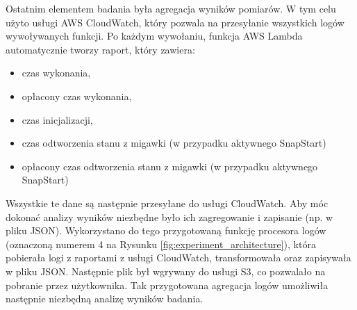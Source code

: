 Ostatnim elementem badania była agregacja wyników pomiarów.
W tym celu użyto usługi AWS CloudWatch, który pozwala na przesyłanie wszystkich logów wywoływanych funkcji.
Po każdym wywołaniu, funkcja AWS Lambda automatycznie tworzy raport, który zawiera:
\begin{itemize}
    \item czas wykonania,
    \item opłacony czas wykonania,
    \item czas inicjalizacji,
    \item czas odtworzenia stanu z migawki (w przypadku aktywnego SnapStart)
    \item opłacony czas odtworzenia stanu z migawki (w przypadku aktywnego SnapStart)
\end{itemize}
Wszystkie te dane są następnie przesyłane do usługi CloudWatch. 
Aby móc dokonać analizy wyników niezbędne było ich zagregowanie i zapisanie (np. w pliku JSON).
Wykorzystano do tego przygotowaną funkcję procesora logów (oznaczoną numerem 4 na Rysunku \ref{fig:experiment_architecture}), która pobierała logi z raportami z usługi CloudWatch, transformowała oraz zapisywała w pliku JSON.
Następnie plik był wgrywany do usługi S3, co pozwalało na pobranie przez użytkownika.
Tak przygotowana agregacja logów umożliwiła następnie niezbędną analizę wyników badania.

